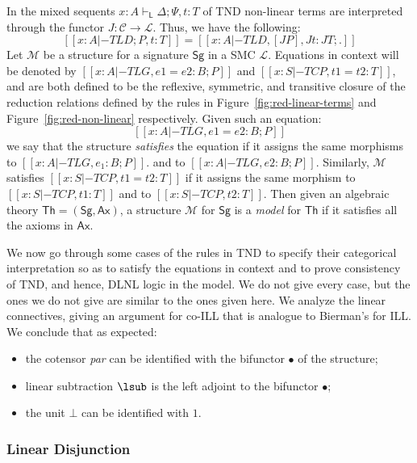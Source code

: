 In the mixed sequents $x:A \vdash_{\mathsf{L}} \Delta ; \Psi, t:T$ of TND non-linear terms are interpreted through the functor $J :
\mathcal{C} \rightarrow \mathcal{L}$. Thus, we have the following:
\[
  [[ x:A |-TL D ; P, t:T]]  = [[ x:A |-TL D, [ J P ] , J t : J T ; . ]]
\]  
Let $\mathcal{M}$ be a structure for a signature $\mathsf{Sg}$ in a
SMC $\mathcal{L}$. Equations in context will be denoted by $[[x: A
    |-TL G, e1 = e2 : B; P]]$ and $[[x: S |-TC P, t1 = t2 : T]]$, and
are both defined to be the reflexive, symmetric, and transitive
closure of the reduction relations defined by the rules in
Figure~\ref{fig:red-linear-terms} and Figure~\ref{fig:red-non-linear}
respectively.  Given such an equation:
$$
[[x: A |-TL G, e1 = e2 : B; P]]
$$
we say that the structure \emph{satisfies} the equation if it assigns the same morphisms to  
$[[x: A |-TL G, e_1 : B; P]]$.  and to $[[x : A |-TL G, e2 : B;P]]$.
Similarly, $\mathcal{M}$ satisfies $[[x: S |-TC P, t1 = t2 : T]]$ if it assigns the same morphism
to $[[x: S |-TC P, t1 : T]]$ and to $[[x: S |-TC P,  t2 : T]]$.
Then given an algebraic theory 
$\mathsf{Th} = (\mathsf{Sg}, \mathsf{Ax})$, a structure $\mathcal{M}$ for $\mathsf{Sg}$ is a {\em model} for $\mathsf{Th}$ if it satisfies all the 
axioms in $\mathsf{Ax}$. 

We now go through some cases of the rules in TND to specify their
categorical interpretation so as to satisfy the equations in context
and to prove consistency of TND, and hence, DLNL logic in the model.
We do not give every case, but the ones we do not give are similar to
the ones given here. We analyze the linear connectives, giving an
argument for co-ILL that is analogue to Bierman's for ILL. We conclude
that as expected:
\begin{itemize}
\item the cotensor \emph{par} can be identified with the bifunctor
  $\bullet$ of the structure;
\item linear subtraction $\lsub$ is the left adjoint to the bifunctor
  $\bullet$;
\item the unit $\bot$ can be identified with $1$.
\end{itemize}

\subsubsection{Linear Disjunction}\label{lindisj} 

